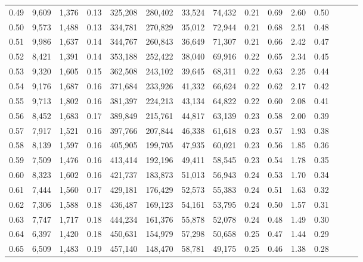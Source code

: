 \begin{tabular}{rrrrrrrrrrrrrrr}
0.49 &   9,609 &  1,376 &  0.13 &  325,208 &  280,402 &   33,524 &   74,432 &  0.21 &  0.69 &  2.60 &      0.50 \\
0.50 &   9,573 &  1,488 &  0.13 &  334,781 &  270,829 &   35,012 &   72,944 &  0.21 &  0.68 &  2.51 &      0.48 \\
0.51 &   9,986 &  1,637 &  0.14 &  344,767 &  260,843 &   36,649 &   71,307 &  0.21 &  0.66 &  2.42 &      0.47 \\
0.52 &   8,421 &  1,391 &  0.14 &  353,188 &  252,422 &   38,040 &   69,916 &  0.22 &  0.65 &  2.34 &      0.45 \\
0.53 &   9,320 &  1,605 &  0.15 &  362,508 &  243,102 &   39,645 &   68,311 &  0.22 &  0.63 &  2.25 &      0.44 \\
0.54 &   9,176 &  1,687 &  0.16 &  371,684 &  233,926 &   41,332 &   66,624 &  0.22 &  0.62 &  2.17 &      0.42 \\
0.55 &   9,713 &  1,802 &  0.16 &  381,397 &  224,213 &   43,134 &   64,822 &  0.22 &  0.60 &  2.08 &      0.41 \\
0.56 &   8,452 &  1,683 &  0.17 &  389,849 &  215,761 &   44,817 &   63,139 &  0.23 &  0.58 &  2.00 &      0.39 \\
0.57 &   7,917 &  1,521 &  0.16 &  397,766 &  207,844 &   46,338 &   61,618 &  0.23 &  0.57 &  1.93 &      0.38 \\
0.58 &   8,139 &  1,597 &  0.16 &  405,905 &  199,705 &   47,935 &   60,021 &  0.23 &  0.56 &  1.85 &      0.36 \\
0.59 &   7,509 &  1,476 &  0.16 &  413,414 &  192,196 &   49,411 &   58,545 &  0.23 &  0.54 &  1.78 &      0.35 \\
0.60 &   8,323 &  1,602 &  0.16 &  421,737 &  183,873 &   51,013 &   56,943 &  0.24 &  0.53 &  1.70 &      0.34 \\
0.61 &   7,444 &  1,560 &  0.17 &  429,181 &  176,429 &   52,573 &   55,383 &  0.24 &  0.51 &  1.63 &      0.32 \\
0.62 &   7,306 &  1,588 &  0.18 &  436,487 &  169,123 &   54,161 &   53,795 &  0.24 &  0.50 &  1.57 &      0.31 \\
0.63 &   7,747 &  1,717 &  0.18 &  444,234 &  161,376 &   55,878 &   52,078 &  0.24 &  0.48 &  1.49 &      0.30 \\
0.64 &   6,397 &  1,420 &  0.18 &  450,631 &  154,979 &   57,298 &   50,658 &  0.25 &  0.47 &  1.44 &      0.29 \\
0.65 &   6,509 &  1,483 &  0.19 &  457,140 &  148,470 &   58,781 &   49,175 &  0.25 &  0.46 &  1.38 &      0.28 \\

\end{tabular}
